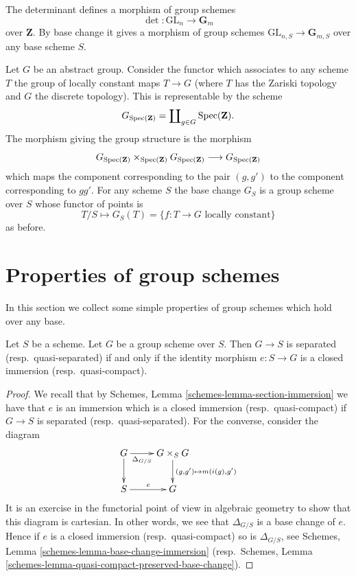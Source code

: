 \begin{example}
\label{example-determinant}
The determinant defines a morphism of group schemes
$$
\det : \text{GL}_n \longrightarrow \mathbf{G}_m
$$
over $\mathbf{Z}$. By base change it gives a morphism
of group schemes $\text{GL}_{n, S} \to \mathbf{G}_{m, S}$
over any base scheme $S$.
\end{example}

\begin{example}
\label{example-constant-group}
Let $G$ be an abstract group. Consider the functor
which associates to any scheme $T$ the group
of locally constant maps $T \to G$ (where $T$ has the Zariski topology
and $G$ the discrete topology). This is representable by the scheme
$$
G_{\mathop{\mathrm{Spec}}(\mathbf{Z})} =
\coprod\nolimits_{g \in G} \mathop{\mathrm{Spec}}(\mathbf{Z}).
$$
The morphism giving the group structure is the morphism
$$
G_{\mathop{\mathrm{Spec}}(\mathbf{Z})}
\times_{\mathop{\mathrm{Spec}}(\mathbf{Z})}
G_{\mathop{\mathrm{Spec}}(\mathbf{Z})}
\longrightarrow
G_{\mathop{\mathrm{Spec}}(\mathbf{Z})}
$$
which maps the component corresponding to the pair $(g, g')$ to the
component corresponding to $gg'$. For any scheme $S$ the base change
$G_S$ is a group scheme over $S$ whose functor of points is
$$
T/S
\longmapsto
G_S(T) = \{f : T \to G \text{ locally constant}\}
$$
as before.
\end{example}





\section{Properties of group schemes}
\label{section-properties-group-schemes}

\noindent
In this section we collect some simple properties of group schemes which
hold over any base.

\begin{lemma}
\label{lemma-group-scheme-separated}
Let $S$ be a scheme.
Let $G$ be a group scheme over $S$.
Then $G \to S$ is separated (resp.\ quasi-separated) if and only if
the identity morphism $e : S \to G$ is a closed immersion
(resp.\ quasi-compact).
\end{lemma}

\begin{proof}
We recall that by
Schemes, Lemma \ref{schemes-lemma-section-immersion}
we have that $e$ is an immersion which is a closed immersion
(resp.\ quasi-compact) if $G \to S$ is separated (resp.\ quasi-separated).
For the converse, consider the diagram
$$
\xymatrix{
G \ar[r]_-{\Delta_{G/S}} \ar[d] &
G \times_S G \ar[d]^{(g, g') \mapsto m(i(g), g')} \\
S \ar[r]^e & G
}
$$
It is an exercise in the functorial point of view in algebraic geometry
to show that this diagram is cartesian. In other words, we see that
$\Delta_{G/S}$ is a base change of $e$. Hence if $e$ is a
closed immersion (resp.\ quasi-compact) so is $\Delta_{G/S}$, see
Schemes, Lemma \ref{schemes-lemma-base-change-immersion}
(resp.\ Schemes, Lemma
\ref{schemes-lemma-quasi-compact-preserved-base-change}).
\end{proof}

